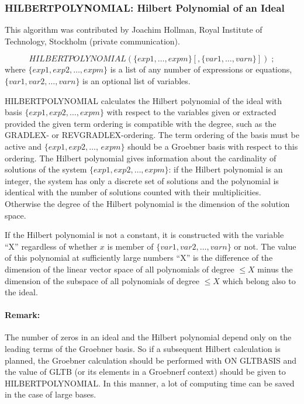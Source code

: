 \subsubsection{HILBERTPOLYNOMIAL: Hilbert Polynomial of an Ideal}
This algorithm was contributed by {\sc Joachim Hollman}, Royal
Institute of Technology, Stockholm (private communication).

\[
HILBERTPOLYNOMIAL (\{exp1, \ldots , expm\}
[,\{var1, \ldots , varn\}])\;;
\]
where $\{exp1, exp2, \ldots , expm\}$ is a list of any number of
expressions or equations, $\{var1, var2, \ldots , varn\}$ is an
optional list of variables.

HILBERTPOLYNOMIAL calculates the Hilbert polynomial of the ideal
with basis $\{exp1, exp2, \ldots , expm\}$ with respect to the
variables given or extracted provided the given term ordering is
compatible with the degree, such as the GRADLEX- or REVGRADLEX-ordering.
The term ordering of the basis
must be active and $\{exp1, exp2,\ldots$, $ expm\}$ should be a
Groebner basis with respect to this ordering. The Hilbert polynomial
gives information about the cardinality of solutions of the system
$\{exp1, exp2, \ldots , expm\}$: if the Hilbert polynomial is an
integer, the system has only a discrete set of solutions and the
polynomial is identical with the number of solutions counted with
their multiplicities. Otherwise the degree of the Hilbert
polynomial is the dimension of the solution space.

If the Hilbert polynomial is not a constant, it is constructed with the
variable ``X'' regardless of whether $x$ is member of $\{var1, var2, \ldots ,
varn\}$ or not. The value of this polynomial at sufficiently
large numbers  ``X''
is the difference
of the dimension of the linear vector space of all polynomials of degree
$ \leq X $ minus the dimension of the subspace of all polynomials of
degree $\leq X $ which belong also to the ideal.

\paragraph{Remark:} The number of zeros in an ideal and the
Hilbert polynomial depend only on the leading terms of the
Groebner basis. So if a subsequent Hilbert calculation is planned, the
Groebner calculation should be performed with ON GLTBASIS and
the value of GLTB (or its elements in a Groebnerf context) should be
given to HILBERTPOLYNOMIAL.  In this manner, a lot of computing time can be
saved in the case of large bases.

